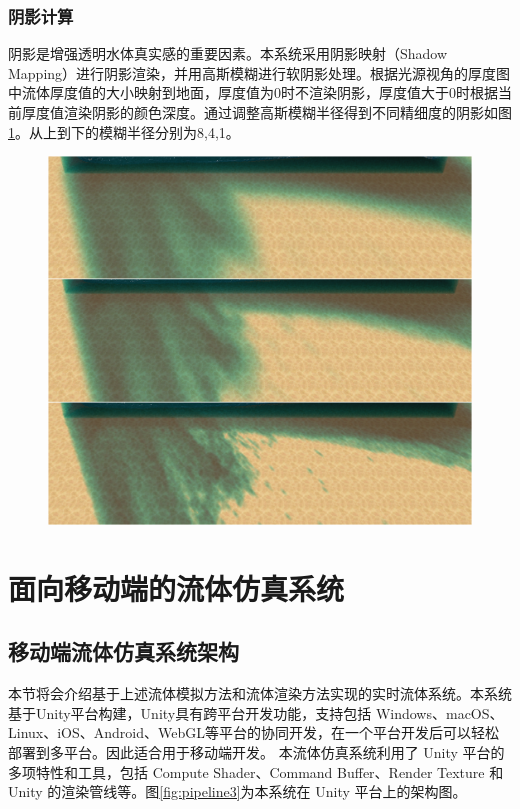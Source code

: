 \subsection{阴影计算}
阴影是增强透明水体真实感的重要因素。本系统采用阴影映射（Shadow Mapping）进行阴影渲染，并用高斯模糊进行软阴影处理。根据光源视角的厚度图中流体厚度值的大小映射到地面，厚度值为0时不渲染阴影，厚度值大于0时根据当前厚度值渲染阴影的颜色深度。通过调整高斯模糊半径得到不同精细度的阴影如图\ref{fig:compare3}。从上到下的模糊半径分别为8,4,1。
\begin{figure}[ht]
    \centering
    \includegraphics[width=12cm]{image/compare3.png}
    \label{fig:compare3}
\end{figure}








\chapter{面向移动端的流体仿真系统}

\section{移动端流体仿真系统架构}
本节将会介绍基于上述流体模拟方法和流体渲染方法实现的实时流体系统。本系统基于Unity平台构建，Unity具有跨平台开发功能，支持包括 Windows、macOS、Linux、iOS、Android、WebGL等平台的协同开发，在一个平台开发后可以轻松部署到多平台。因此适合用于移动端开发。
本流体仿真系统利用了 Unity 平台的多项特性和工具，包括 Compute Shader、Command Buffer、Render Texture 和 Unity 的渲染管线等。图\ref{fig:pipeline3}为本系统在 Unity 平台上的架构图。

